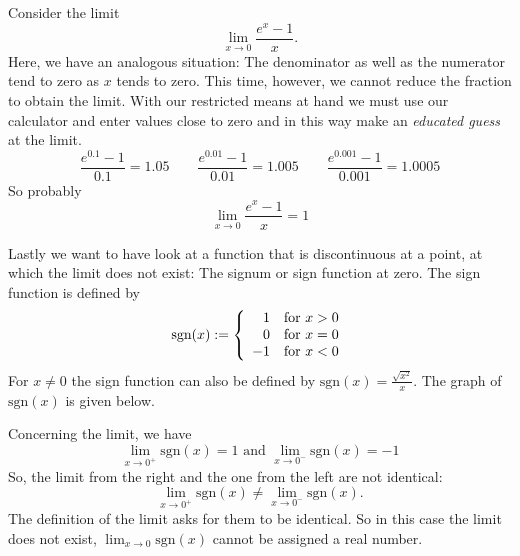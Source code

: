 \documentclass[12pt,eng]{skript_ogg}
\begin{document}
\begin{beispiel}
Consider the limit
\[\lim_{x\rightarrow 0}\frac{e^x-1}{x}.\]
Here, we have an analogous situation: The denominator as well as the numerator tend to zero as $x$ tends to zero. This time, however, we cannot reduce the fraction to obtain the limit. With our restricted means at hand we must use our calculator and enter values close to zero and in this way make an \emph{educated guess} at the limit.
\[\frac{e^{0.1}-1}{0.1}=1.05\qquad\frac{e^{0.01}-1}{0.01}=1.005\qquad\frac{e^{0.001}-1}{0.001}=1.0005\]
So probably
\[\lim_{x\rightarrow 0}\frac{e^x-1}{x}=1\]
\end{beispiel}

\begin{beispiel}\label{beispielsignum}
Lastly we want to have look at a function that is discontinuous at a point, at which the limit does not exist: The signum or sign function at zero. The sign function is defined by
\[\text{sgn}(x):=\left\{ \begin{array}{r@{\quad \mbox{for } }l}1 & x> 0 \\
0 & x=0\\
-1 & x< 0\end{array}\right.\]
For $x\neq0$ the sign function can also be defined by $\text{sgn}(x)=\frac{\sqrt{x^2}}{x}$. The graph of $\text{sgn}(x)$ is given below.

\vspace{-3mm}

\begin{center}
\end{center}

\vspace{-3mm}

Concerning the limit, we have
\[\lim_{x\rightarrow 0^+}\text{sgn}(x)=1\text{ and }\lim_{x\rightarrow 0^-}\text{sgn}(x)=-1\]
So, the limit from the right and the one from the left are not identical:
\[\lim_{x\rightarrow 0^+}\text{sgn}(x)\neq \lim_{x\rightarrow 0^-}\text{sgn}(x).\]
The definition of the limit asks for them to be identical. So in this case the limit does not exist, $\lim_{x\rightarrow 0} \text{sgn}(x) $ cannot be assigned a real number.

\end{beispiel}
\end{document}
